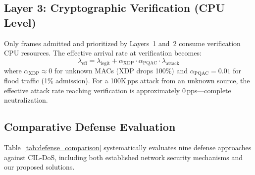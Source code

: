 \documentclass{ieeeaccess}
\begin{document}
\subsection{Layer 3: Cryptographic Verification (CPU Level)}
Only frames admitted and prioritized by Layers~1 and~2 consume verification CPU resources. The effective arrival rate at verification becomes:
\begin{equation}
\lambda_{\text{eff}} = \lambda_{\text{legit}} + \alpha_{\text{XDP}} \cdot \alpha_{\text{PQAC}} \cdot \lambda_{\text{attack}}
\end{equation}
where $\alpha_{\text{XDP}} \approx 0$ for unknown MACs (XDP drops 100\%) and $\alpha_{\text{PQAC}} = 0.01$ for flood traffic (1\% admission). For a 100K\,pps attack from an unknown source, the effective attack rate reaching verification is approximately 0\,pps---complete neutralization.

\subsection{Comparative Defense Evaluation}
Table~\ref{tab:defense_comparison} systematically evaluates nine defense approaches against CIL-DoS, including both established network security mechanisms and our proposed solutions.
\end{document}
